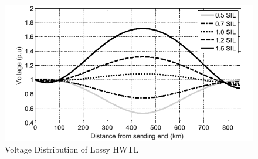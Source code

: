 \documentclass[12pt,a4paper]{reportmod}
\begin{document}
\begin{figure}[h]
\label{fig:lossy}
\begin{center}
\includegraphics[scale=0.5]{lossy.png}
\caption{Voltage Distribution of Lossy HWTL}
\end{center}
\end{figure}
\end{document}
